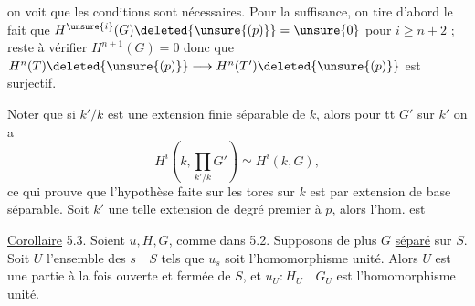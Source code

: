 on voit que les conditions sont nécessaires.
Pour la suffisance, on tire d'abord le fait
que $H^{\unsure{i}}(G)\deleted{\unsure{(p)}}=\unsure{0}$ pour $i\geq n+2$ ; reste
à vérifier $H^{n+1}(G)=0$ donc que
$H^n(T)\deleted{\unsure{(p)}}\longrightarrow H^n(T')\deleted{\unsure{(p)}}$ est surjectif.

Noter que si $k'/k$ est une extension finie
séparable de $k$, alors pour tt $G'$ sur $k'$
on a
\[
H^i(k,\prod_{k'/k}G')\simeq H^i(k,G),
\]
ce qui prouve que l'hypothèse faite sur
les tores sur $k$ est \uline{} par
extension de base séparable. Soit $k'$ une
telle extension de degré premier à $p$, alors
l'hom. 
est  



\uline{Corollaire} 5.3. Soient $u,H,G$, comme dans 5.2. Supposons de plus
$G$ \uline{séparé} sur $S$. Soit $U$ l'ensemble des $s\quad S$ tels que $u_s$ soit l'homomorphisme unité. Alors $U$ est une partie à la fois ouverte et fermée de $S$,
et $u_U:H_U\quad G_U$ est l'homomorphisme unité.

